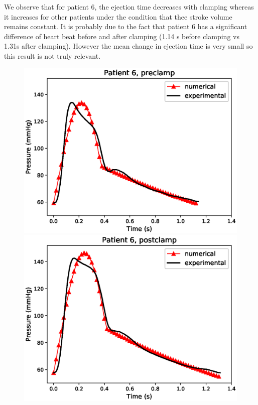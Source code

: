 \documentclass{config}
\begin{document}
We observe that for patient 6, the ejection time decreases with clamping whereas it increases for other patients under the condition that thee stroke volume remains constant. It is probably due to the fact that patient 6 has a significant difference of heart beat before and after clamping (1.14 s before clamping vs 1.31s after clamping). However the mean change in ejection time is very small so this result is not truly relevant.  

\begin{figure}[H]
\begin{minipage}{0.48\textwidth}
\includegraphics[scale=0.5]{Figures/6preclamp.eps}
\end{minipage}
\begin{minipage}{0.48\textwidth}
\includegraphics[scale=0.5]{Figures/6postclamp.eps}
\end{minipage}


\end{figure}
\end{document}
